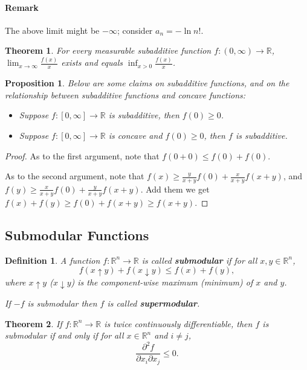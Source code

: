 \documentclass[openany]{book}
\newtheorem{definition}{Definition}[chapter]
\newtheorem{theorem}{Theorem}[chapter]
\newtheorem{proposition}{Proposition}[chapter]
\theoremstyle{remark}
\begin{document}
\paragraph{Remark}
The above limit might be $-\infty$; consider $a_n=-\ln n!$.

\begin{theorem}
    For every measurable subadditive function $f:(0,\infty)\to \mathbb{R}$, $\lim_{x\to\infty}\frac{f(x)}{x}$ exists and equals $\inf_{x>0}\frac{f(x)}{x}$.
\end{theorem}
\begin{proposition}
    Below are some claims on subadditive functions, and on the relationship between subadditive functions and concave functions:
    \begin{itemize}
        \item Suppose $f:[0,\infty]\to \mathbb{R}$ is subadditive, then $f(0)\ge0$.
        \item Suppose $f:[0,\infty]\to \mathbb{R}$ is concave and $f(0)\ge0$, then $f$ is subadditive.
    \end{itemize}
\end{proposition}
\begin{proof}
    As to the first argument, note that $f(0+0)\le f(0)+f(0)$.

    As to the second argument, note that $f(x)\ge \frac{y}{x+y}f(0)+\frac{x}{x+y}f(x+y)$, and $f(y)\ge \frac{x}{x+y}f(0)+\frac{y}{x+y}f(x+y)$. Add them we get $f(x)+f(y)\ge f(0)+f(x+y)\ge f(x+y)$.
\end{proof}

\subsection{Submodular Functions}
\begin{definition}
    A function $f:\mathbb{R}^n\to \mathbb{R}$ is called \textbf{submodular} if for all $x,y\in \mathbb{R}^n$,
    \begin{equation}
        f(x\uparrow y)+f(x\downarrow y)\le f(x)+f(y),
    \end{equation}
    where $x\uparrow y$ ($x\downarrow y$) is the component-wise maximum (minimum) of $x$ and $y$.

    If $-f$ is submodular then $f$ is called \textbf{supermodular}.
\end{definition}
\begin{theorem}
    If $f:\mathbb{R}^n\to \mathbb{R}$ is twice continuously differentiable, then $f$ is submodular if and only if for all $x\in \mathbb{R}^n$ and $i\ne j$,
    \begin{equation}
        \frac{\partial^2f}{\partial x_i\partial x_j}\le0.
    \end{equation}
\end{theorem}
\end{document}
